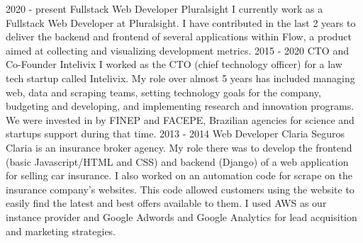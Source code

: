 
\cvevent
    {2020 - present}
    {Fullstack Web Developer}
    {Pluralsight}
    {I currently work as a Fullstack Web Developer at Pluralsight. I have contributed in the last 2 years to deliver the backend and frontend of several applications within Flow, a product aimed at collecting and visualizing development metrics.}
    {}
    {}
    {}
\cvevent
    {2015 - 2020}
    {CTO and Co-Founder}
    {Intelivix}
    {I worked as the CTO (chief technology officer) for a law tech startup called Intelivix. My role over almost 5 years has included managing web, data and scraping teams, setting technology goals for the company, budgeting and developing, and implementing research and innovation programs. We were invested in by FINEP and FACEPE, Brazilian agencies for science and startups support during that time.}
    {}
    {}
    {}
\cvevent
    {2013 - 2014}
    {Web Developer}
    {Claria Seguros}
    {Claria is an insurance broker agency. My role there was to develop the frontend (basic Javascript/HTML and CSS) and backend (Django) of a web application for selling car insurance. I also worked on an automation code for scrape on the insurance company’s websites. This code allowed customers using the website to easily find the latest and best offers available to them. I used AWS as our instance provider and Google Adwords and Google Analytics for lead acquisition and marketing strategies.}
    {}
    {}
